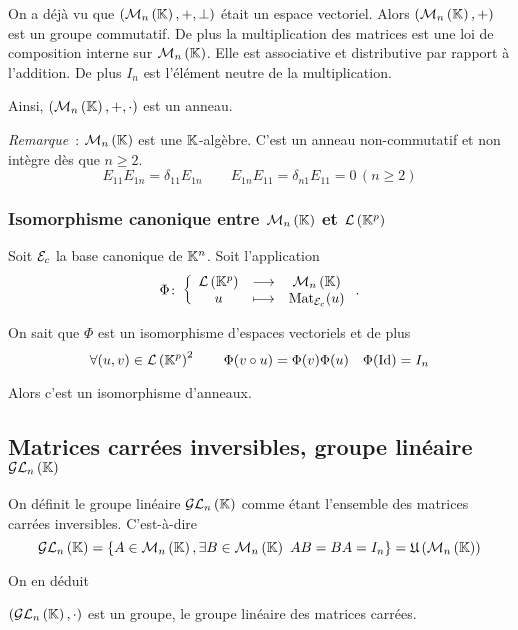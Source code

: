 On a déjà vu que \((\mathcal{M}_{n}\left(\mathbb{K}\right),+,\perp)\) était un espace vectoriel. Alors
\((\mathcal{M}_{n}\left(\mathbb{K}\right),+)\) est un groupe commutatif. De plus la multiplication des
matrices est une loi de composition interne sur \(\mathcal{M}_{n}\left(\mathbb{K}\right)\). Elle est
associative et distributive par rapport à l'addition. De plus \(I_n\) est
l'élément neutre de la multiplication.

Ainsi, \((\mathcal{M}_{n}\left(\mathbb{K}\right),+,\cdot)\) est un anneau.

\emph{Remarque}~: \(\mathcal{M}_{n}\left(\mathbb{K}\right)\) est une \(\mathbb{K}\)-algèbre. C'est un anneau
non-commutatif et non intègre dès que \(n\geqslant 2\).
\begin{equation}
  E_{11}E_{1n}=\delta_{11}E_{1n} \qquad E_{1n}E_{11}=\delta_{n1}E_{11}=0 \,
  (n\geqslant 2)
\end{equation}

\subsubsection{Isomorphisme canonique entre \(\mathcal{M}_{n}\left(\mathbb{K}\right)\) et \(\mathcal{L}\left(\mathbb{K}^p\right)\)}

Soit \(\mathcal{E}_c\) la base canonique de \(\mathbb{K}^n\). Soit l'application
\begin{equation}
  \Phi\colon\left\{\begin{array}{ccc}\mathcal{L}\left(\mathbb{K}^p\right) & \longrightarrow &\mathcal{M}_{n}\left(\mathbb{K}\right)\\u & \longmapsto & \mathrm{Mat}_{\mathcal{E}_c}(u)\end{array}\right..
\end{equation}

On sait que \(\Phi\) est un isomorphisme d'espaces vectoriels et de plus
\begin{equation}
  \forall (u,v) \in \mathcal{L}\left(\mathbb{K}^p\right)^2 \qquad \Phi(v \circ u) =\Phi(v) \Phi(u) \quad
  \Phi(\operatorname{Id})=I_n
\end{equation}

Alors c'est un isomorphisme d'anneaux.

\subsection{Matrices carrées inversibles, groupe linéaire \(\mathcal{GL}_{n}\left(\mathbb{K}\right)\)}

On définit le groupe linéaire \(\mathcal{GL}_{n}\left(\mathbb{K}\right)\) comme étant l'ensemble des
matrices carrées inversibles. C'est-à-dire
\begin{equation}
  \mathcal{GL}_{n}\left(\mathbb{K}\right)=\{A \in \mathcal{M}_{n}\left(\mathbb{K}\right), \exists B \in \mathcal{M}_{n}\left(\mathbb{K}\right) \
  AB=BA=I_n\}=\mathfrak{U}\left(\mathcal{M}_{n}\left(\mathbb{K}\right)\right)
\end{equation}

On en déduit
\begin{theo}
  \((\mathcal{GL}_{n}\left(\mathbb{K}\right),\cdot)\)  est un groupe, le groupe linéaire des matrices
  carrées.
\end{theo}


